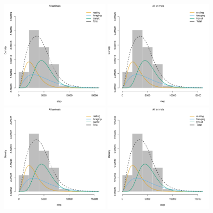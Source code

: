 \documentclass[12pt]{article}
\begin{document}
\begin{figure}[htbp]
  \includegraphics[width=0.49\textwidth,page=1]{plot_nfsResults}
  \includegraphics[width=0.49\textwidth,page=2]{plot_nfsResults}
  \includegraphics[width=0.49\textwidth,page=3]{plot_nfsResults}
  \includegraphics[width=0.49\textwidth,page=4]{plot_nfsResults}

\end{figure}
\end{document}
